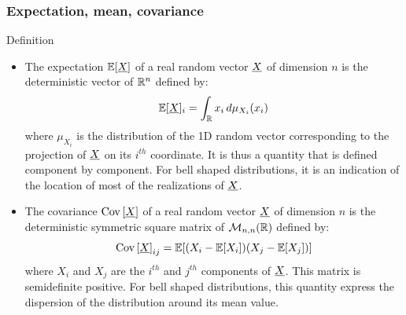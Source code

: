 \documentclass[8pt]{beamer}
\begin{document}
\begin{frame}
  \frametitle{Expectation, mean, covariance}
  \begin{block}{Definition}
    \begin{itemize}
    \item The \alert{expectation ${\mathbb E}[{\underline{X}}]$} of a real random vector ${\underline{X}}$ of dimension $n$ is the deterministic vector of ${\mathbb R}^n$ defined by:
      \begin{equation}
        {\mathbb E}[{\underline{X}}]_i = \int_{{\mathbb R}}x_i\,d\mu_{X_i}(x_i)
      \end{equation}
      where $\mu_{X_i}$ is the distribution of the 1D random vector corresponding to the projection of ${\underline{X}}$ on its $i^{th}$ coordinate. It is thus a quantity that is defined component by component. For bell shaped distributions, it is an indication of the location of most of the realizations of ${\underline{X}}$.
    \item The \alert{covariance ${\rm Cov}\left[ {\underline{X}} \right]$} of a real random vector ${\underline{X}}$ of dimension $n$ is the deterministic symmetric square matrix of $\mathcal{M}_{n,n}({\mathbb R})$ defined by:
      \begin{equation}
        {\rm Cov}\left[ {\underline{X}} \right]_{ij} = {\mathbb E}[(X_i-{\mathbb E}[X_i])(X_j-{\mathbb E}[X_j])]
      \end{equation}
      where $X_i$ and $X_j$ are the $i^{th}$ and $j^{th}$ components of ${\underline{X}}$. This matrix is semidefinite positive. For bell shaped distributions, this quantity express the dispersion of the distribution around its mean value.
    \end{itemize}
  \end{block}
\end{frame}
\end{document}

